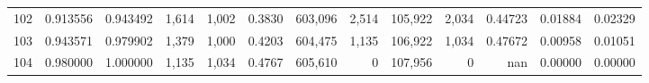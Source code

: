 \begin{tabular}{rrrrrrrrrrrrr}
102 &  0.913556 &  0.943492 &   1,614 &  1,002 &                                     0.3830 &  603,096 &    2,514 &  105,922 &    2,034 &  0.44723 &  0.01884 &  0.02329 \\
103 &  0.943571 &  0.979902 &   1,379 &  1,000 &                                     0.4203 &  604,475 &    1,135 &  106,922 &    1,034 &  0.47672 &  0.00958 &  0.01051 \\
104 &  0.980000 &  1.000000 &   1,135 &  1,034 &                                     0.4767 &  605,610 &        0 &  107,956 &        0 &      nan &  0.00000 &  0.00000 \\
\bottomrule
\end{tabular}
